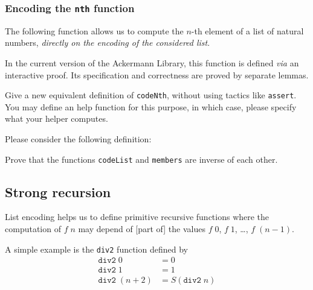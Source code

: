   \subsubsection{Encoding the \texttt{nth} function}

  The following function allows us to compute the $n$-th element of a list of natural numbers, \emph{directly on the encoding of the considered list}.

  In the current version of the Ackermann Library, this function is defined \emph{via} an interactive proof. Its specification and
  correctness are proved by  separate lemmas. 
  


  \begin{exercise}
  Give a new equivalent definition of \texttt{codeNth}, without using tactics like \texttt{assert}.  You may define an help function for this purpose, in which case, please specify what your helper computes.
  \end{exercise}

  
  \begin{exercise}
    Please consider the following definition:

    

   
    \noindent
    
    Prove that the functions \texttt{codeList} and \texttt{members} are inverse of each other.
  \end{exercise}

  \subsection{Strong recursion}

  List encoding helps us to define primitive recursive functions
  where the computation of $f\;n$ may  depend of
  [part of] the values $f\;0$, $f\;1$, \dots, $f\;(n-1)$.

  A simple example is the \texttt{div2} function
  defined by
  \begin{align*}
    \texttt{div2}\;0&=0\\
    \texttt{div2}\;1&=1\\
    \texttt{div2}\;(n+2)&=S(\texttt{div2}\;n)\\
  \end{align*}

